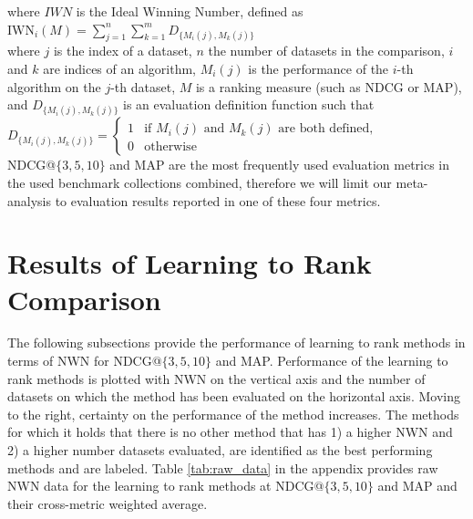 \documentclass[english, authoryear, preprint]{elsarticle}
\begin{document}
\noindent
where $IWN$ is the Ideal Winning Number, defined as\\

$\text{IWN}_i(M) = \sum\nolimits_{j=1}^n \sum\nolimits_{k=1}^m D_{\{M_i(j),M_k(j)\}}$\\

where $j$ is the index of a dataset, $n$ the number of datasets in the comparison, $i$ and $k$ are indices of an algorithm, $M_i(j)$ is the performance of the $i$-th algorithm on the $j$-th dataset, $M$ is a ranking measure (such as NDCG or MAP), and $D_{\{M_i(j),M_k(j)\}}$ is an evaluation definition function such that\\

$D_{\{M_i(j),M_k(j)\}} = \begin{cases}
1 & \text{if } M_i(j) \text{ and } M_k(j) \text{ are both defined}, \\
0 & \text{otherwise}
\end{cases}$\\

NDCG@$\{3,5,10\}$ and MAP are the most frequently used evaluation metrics in the used benchmark collections combined, therefore we will limit our meta-analysis to evaluation results reported in one of these four metrics.

\section{Results of Learning to Rank Comparison}
The following subsections provide the performance of learning to rank methods in terms of NWN for NDCG@$\{3,5,10\}$ and MAP. Performance of the learning to rank methods is plotted with NWN on the vertical axis and the number of datasets on which the method has been evaluated on the horizontal axis. Moving to the right, certainty on the performance of the method increases. The methods for which it holds that there is no other method that has 1) a higher NWN and 2) a higher number datasets evaluated, are identified as the best performing methods and are labeled. Table \ref{tab:raw_data} in the appendix provides raw NWN data for the learning to rank methods at NDCG@$\{3,5,10\}$ and MAP and their cross-metric weighted average.
\end{document}
